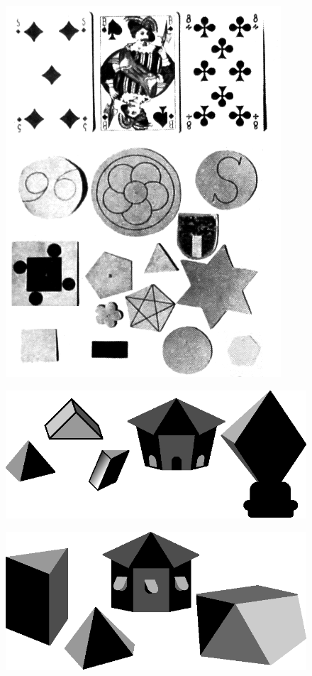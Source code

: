 \begin{figure}[H]
\centering
\includegraphics[scale=.85]{figure/fig_36.eps}
\caption{}\label{chap6-fig36}
\end{figure}

\begin{figure}[H]
\centering
\includegraphics[scale=.85]{figure/fig_37.eps}
\caption{}\label{chap6-fig37}
\end{figure}

\begin{figure}[H]
\centering
\includegraphics[scale=.8]{figure/fig_38.eps}
\caption{}\label{chap6-fig38}
\end{figure}

